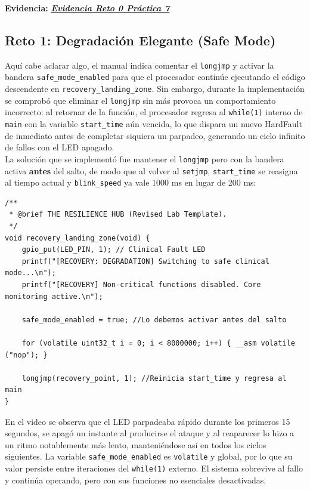 \documentclass[12pt,letterpaper]{article}
\begin{document}
\textbf{Evidencia:}
\href{https://drive.google.com/file/d/1Hh8ghAZ_HhTtK0zuvYGGHo4ie9aAXv0f/view?usp=sharing}
     {\textbf{\textit{\textcolor{linkblue}{Evidencia Reto 0 Práctica 7}}}}
     
\subsection*{Reto 1: Degradación Elegante (Safe Mode)}
Aquí cabe aclarar algo, el manual indica comentar el \texttt{longjmp} y activar la bandera
\texttt{safe\_mode\_enabled} para que el procesador continúe ejecutando el código descendente en
\texttt{recovery\_landing\_zone}. Sin embargo, durante la implementación se comprobó que
eliminar el \texttt{longjmp} sin más provoca un comportamiento incorrecto: al retornar de la función, el
procesador regresa al \texttt{while(1)} interno de \texttt{main} con la variable \texttt{start\_time} aún
vencida, lo que dispara un nuevo HardFault de inmediato antes de completar siquiera un parpadeo, generando un
ciclo infinito de fallos con el LED apagado.\\

La solución que se implementó fue mantener el \texttt{longjmp} pero con  la bandera activa \textbf{antes} del
salto, de modo que al volver al \texttt{setjmp}, \texttt{start\_time} se reasigna al tiempo actual y
\texttt{blink\_speed} ya vale 1000 ms en lugar de 200 ms:
 
\begin{lstlisting}[style=modernc, caption={Degradación Elegante: bandera activa antes del longjmp}]
/**
 * @brief THE RESILIENCE HUB (Revised Lab Template).
 */
void recovery_landing_zone(void) {
    gpio_put(LED_PIN, 1); // Clinical Fault LED
    printf("[RECOVERY: DEGRADATION] Switching to safe clinical mode...\n");
    printf("[RECOVERY] Non-critical functions disabled. Core monitoring active.\n");
 
    safe_mode_enabled = true; //Lo debemos activar antes del salto
 
    for (volatile uint32_t i = 0; i < 8000000; i++) { __asm volatile ("nop"); }
 
    longjmp(recovery_point, 1); //Reinicia start_time y regresa al main
}
\end{lstlisting}
 
En el video se observa que el LED parpadeaba rápido durante los primeros 15 segundos, se apagó un instante al
producirse el ataque y al reaparecer lo hizo a un ritmo notablemente más lento, manteniéndose así en todos los
ciclos siguientes. La variable \texttt{safe\_mode\_enabled} es \texttt{volatile} y global, por lo que su valor
persiste entre iteraciones del \texttt{while(1)} externo. El sistema sobrevive al fallo y continúa operando,
pero con sus funciones no esenciales desactivadas.
\end{document}

